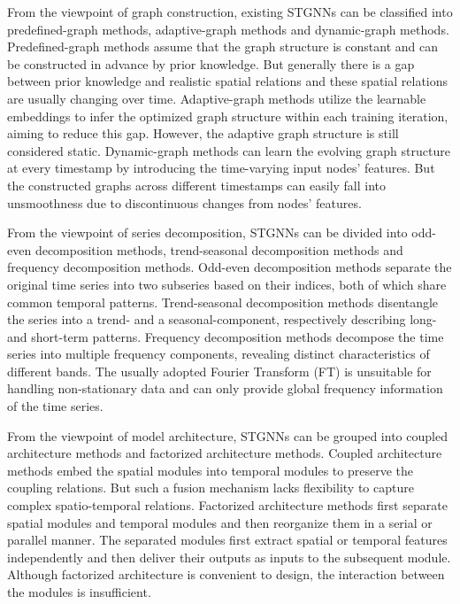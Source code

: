 \documentclass[final,12pt]{elsarticle}
\begin{document}
From the viewpoint of graph construction, 
existing STGNNs can be classified into 
predefined-graph methods, adaptive-graph methods and dynamic-graph methods.  %
Predefined-graph methods \cite{li2017diffusion} assume that 
the graph structure is constant and can be constructed in advance by prior knowledge.
But generally there is a gap between prior knowledge and realistic spatial relations 
and these spatial relations are usually changing over time.  %
Adaptive-graph methods \cite{wu2019graph}\cite{wu2020connecting}\cite{ta2022adaptive} 
utilize the learnable embeddings 
to infer the optimized graph structure within each training iteration, 
aiming to reduce this gap.
However, the adaptive graph structure is still considered static.  %
Dynamic-graph methods 
\cite{guo2021learning}\cite{lan2022dstagnn}\cite{ye2022learning}\cite{xia2025prost} 
can learn the evolving graph structure at every timestamp 
by introducing the time-varying input nodes' features.
But the constructed graphs across different timestamps 
can easily fall into unsmoothness 
due to discontinuous changes from nodes' features.  %

From the viewpoint of series decomposition, 
STGNNs can be divided into odd-even decomposition methods, 
trend-seasonal decomposition methods and frequency decomposition methods.  %
Odd-even decomposition methods \cite{liu2022scinet} separate the original time series 
into two subseries based on their indices, 
both of which share common temporal patterns.  %
Trend-seasonal decomposition methods 
\cite{wu2021autoformer}\cite{wang2024timemixer}\cite{luo2024lsttn}\cite{seo2025st} 
disentangle the series 
into a trend- and a seasonal-component, 
respectively describing long- and short-term patterns.  %
Frequency decomposition methods 
\cite{cao2020spectral}\cite{zhou2022fedformer}\cite{yi2023frequency}\cite{xu2023fits}\cite{tian2025frera} 
decompose the time series 
into multiple frequency components, 
revealing distinct characteristics of different bands.
The usually adopted Fourier Transform (FT) 
is unsuitable for handling non-stationary data 
and can only provide global frequency information of the time series.  %

From the viewpoint of model architecture, 
STGNNs can be grouped into 
coupled architecture methods and factorized architecture methods.  %
Coupled architecture methods \cite{li2017diffusion} 
embed the spatial modules into temporal modules 
to preserve the coupling relations.
But such a fusion mechanism lacks flexibility 
to capture complex spatio-temporal relations.  %
Factorized architecture methods \cite{zhao2019t}\cite{yu2017spatio} 
first separate spatial modules and temporal modules 
and then reorganize them in a serial or parallel manner.
The separated modules first extract spatial or temporal features independently 
and then deliver their outputs as inputs to the subsequent module.
Although factorized architecture is convenient to design, 
the interaction between the modules is insufficient.  %
\end{document}
